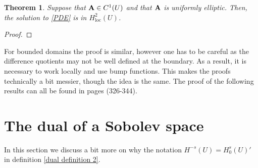 \documentclass[
    a4paper,
    DIV=14,
    abstract=true,
    numbers=noenddot
]
{scrartcl}
\newtheorem{theorem}{Theorem}[section]
\theoremstyle{definition}
\begin{document}
\begin{theorem}\label{higher regularity}
	Suppose that $\vb{A}\in C^1(U)$ and that $\vb{A}$ is uniformly elliptic. Then, the solution to \eqref{PDE} is in $H^2_{\mathrm{loc}}(U)$.
\end{theorem}
\begin{proof}

\end{proof}

For bounded domains the proof is similar, however one has to be careful as the difference quotients may not be well defined at the boundary. As a result, it is necessary to work locally and use bump functions. This makes the proofs technically a bit messier, though the idea is the same. The proof of the following results can all be found in \cite{evans2022partial} pages (326-344).




\appendix
\section{The dual of a Sobolev space}\label{dual section}
In this section we discuss a bit more on why the notation $H^{-s}(U)=H_0^s(U)'$ in definition \ref{dual definition 2}.
\end{document}

